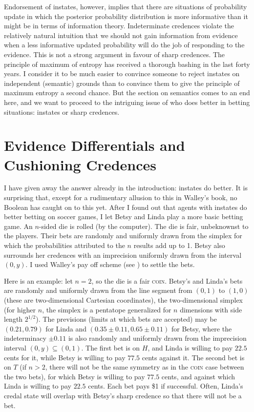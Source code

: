 \documentclass[11pt]{article}
\begin{document}
Endorsement of instates, however, implies that there are situations of
probability update in which the posterior probability distribution is
more informative than it might be in terms of information theory.
Indeterminate credences violate the relatively natural intuition that
we should not gain information from evidence when a less informative
updated probability will do the job of responding to the evidence.
This is not a strong argument in favour of sharp credences. The
principle of maximum of entropy has received a thorough bashing in the
last forty years. I consider it to be much easier to convince someone
to reject instates on independent (semantic) grounds than to convince
them to give the principle of maximum entropy a second chance. But the
section on semantics comes to an end here, and we want to proceed to
the intriguing issue of who does better in betting situations:
instates or sharp credences.

\section{Evidence Differentials and Cushioning Credences}
\label{WalleysWorldCupWoes}

I have given away the answer already in the introduction: instates do
better. It is surprising that, except for a rudimentary allusion to
this in Walley's book, no Boolean has caught on to this yet. After I
found out that agents with instates do better betting on soccer games,
I let Betsy and Linda play a more basic betting game. An $n$-sided die
is rolled (by the computer). The die is fair, unbeknownst to the
players. Their bets are randomly and uniformly drawn from the simplex
for which the probabilities attributed to the $n$ results add up to 1.
Betsy also surrounds her credences with an imprecision uniformly drawn
from the interval $(0,y)$. I used Walley's pay off scheme (see
) to settle the bets.

Here is an example: let $n=2$, so the die is a fair \textsc{coin}.
Betsy's and Linda's bets are randomly and uniformly drawn from the
line segment from $(0,1)$ to $(1,0)$ (these are two-dimensional
Cartesian coordinates), the two-dimensional simplex (for higher $n$,
the simplex is a pentatope generalized for $n$ dimensions with side
length $2^{1/2}$). The previsions (limits at which bets are accepted)
may be $(0.21,0.79)$ for Linda and $(0.35\pm{}0.11,0.65\pm{}0.11)$ for
Betsy, where the indeterminacy $\pm{}0.11$ is also randomly and
uniformly drawn from the imprecision interval $(0,y)\subseteq(0,1)$.
The first bet is on $H$, and Linda is willing to pay $22.5$ cents for
it, while Betsy is willing to pay $77.5$ cents against it. The second
bet is on $T$ (if $n>2$, there will not be the same symmetry as in the
\textsc{coin} case between the two bets), for which Betsy is willing
to pay $77.5$ cents, and against which Linda is willing to pay $22.5$
cents. Each bet pays \$1 if successful. Often, Linda's credal state
will overlap with Betsy's sharp credence so that there will not be a
bet.
\end{document}
